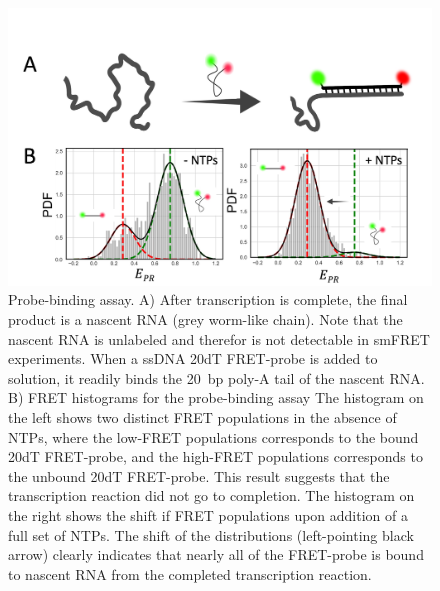 \begin{figure}
    \centering
    \includegraphics[width=\textwidth]{chapters/figures/probe_binding_assay.jpg}
    \caption{\label{fig:probe-binding_assay} 
    Probe-binding assay.
    A) After transcription is complete, the final product is a nascent RNA (grey worm-like chain). Note that the nascent RNA is unlabeled and therefor is not detectable in \ac{smFRET} experiments. 
    When a \ac{ssDNA} 20dT FRET-probe is added to solution, it readily binds the 20~\ac{bp} poly-A tail of the nascent RNA. 
    B) FRET histograms for the probe-binding assay
    The histogram on the left shows two distinct FRET populations in the absence of \ac{NTP}s, where the low-FRET populations corresponds to the bound 20dT FRET-probe, and the high-FRET populations corresponds to the unbound 20dT FRET-probe. 
    This result suggests that the transcription reaction did not go to completion. 
    The histogram on the right shows the shift if FRET populations upon addition of a full set of \ac{NTP}s. 
    The shift of the distributions (left-pointing black arrow) clearly indicates that nearly all of the FRET-probe is bound to nascent RNA from the completed transcription reaction.
    }
\end{figure}

